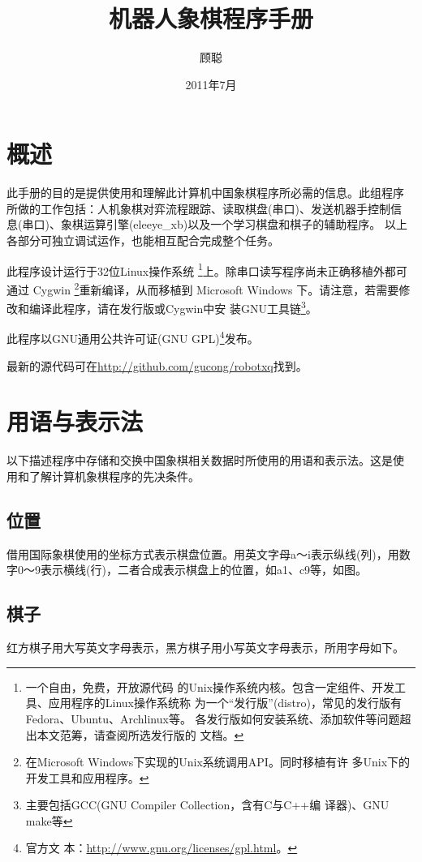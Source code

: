 \documentclass[a4paper]{article}
\title{机器人象棋程序手册}
\author{顾聪}
\date{2011年7月}
\begin{document}
\maketitle
\tableofcontents


\section{概述}
此手册的目的是提供使用和理解此计算机中国象棋程序所必需的信息。此组程序
所做的工作包括：人机象棋对弈流程跟踪、读取棋盘(串口)、发送机器手控制信
息(串口)、象棋运算引擎(eleeye\_xb)以及一个学习棋盘和棋子的辅助程序。
以上各部分可独立调试运作，也能相互配合完成整个任务。

此程序设计运行于32位Linux操作系统 \footnote{一个自由，免费，开放源代码
  的Unix操作系统内核。包含一定组件、开发工具、应用程序的Linux操作系统称
  为一个``发行版''(distro)，常见的发行版有Fedora、Ubuntu、Archlinux等。
  各发行版如何安装系统、添加软件等问题超出本文范筹，请查阅所选发行版的
  文档。}上。除串口读写程序尚未正确移植外都可通过 Cygwin
\footnote{在Microsoft Windows下实现的Unix系统调用API。同时移植有许
  多Unix下的开发工具和应用程序。}重新编译，从而移植到 Microsoft
Windows 下。请注意，若需要修改和编译此程序，请在发行版或Cygwin中安
装GNU工具链\footnote{主要包括GCC(GNU Compiler Collection，含有C与C++编
  译器)、GNU make等}。

此程序以GNU通用公共许可证(GNU GPL)\footnote{官方文
  本：\url{http://www.gnu.org/licenses/gpl.html}。}发布。

最新的源代码可在\url{http://github.com/gucong/robotxq}找到。

\section{用语与表示法}
以下描述程序中存储和交换中国象棋相关数据时所使用的用语和表示法。这是使
用和了解计算机象棋程序的先决条件。

\subsection{位置}
借用国际象棋使用的坐标方式表示棋盘位置。用英文字母a～i表示纵线(列)，用数
字0～9表示横线(行)，二者合成表示棋盘上的位置，如a1、c9等，如图。

\smallboard
\begin{position}
\end{position}

\subsection{棋子}
红方棋子用大写英文字母表示，黑方棋子用小写英文字母表示，所用字母如下。
\end{document}
